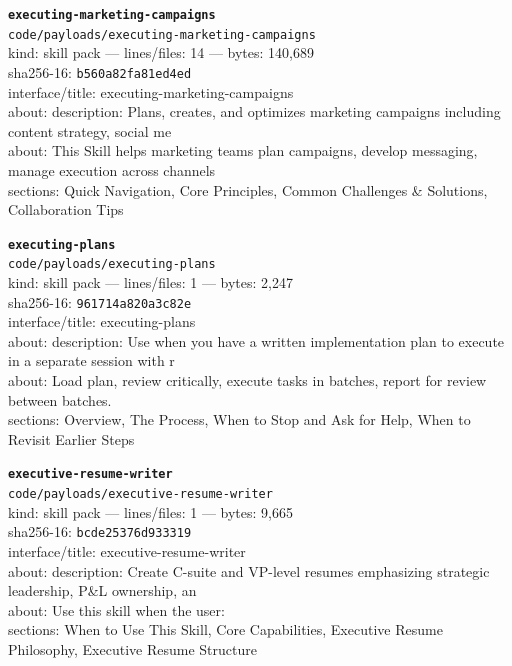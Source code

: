 \noindent\textbf{\texttt{executing-marketing-campaigns}}\\
\texttt{code/payloads/executing-marketing-campaigns}\\
kind: skill pack --- lines/files: 14 --- bytes: 140,689\\
sha256-16: \texttt{b560a82fa81ed4ed}\\
interface/title: executing-marketing-campaigns\\
about: description: Plans, creates, and optimizes marketing campaigns including content strategy, social me\\
about: This Skill helps marketing teams plan campaigns, develop messaging, manage execution across channels\\
sections: Quick Navigation, Core Principles, Common Challenges \& Solutions, Collaboration Tips\\
\vspace*{6.0pt}

\noindent\textbf{\texttt{executing-plans}}\\
\texttt{code/payloads/executing-plans}\\
kind: skill pack --- lines/files: 1 --- bytes: 2,247\\
sha256-16: \texttt{961714a820a3c82e}\\
interface/title: executing-plans\\
about: description: Use when you have a written implementation plan to execute in a separate session with r\\
about: Load plan, review critically, execute tasks in batches, report for review between batches.\\
sections: Overview, The Process, When to Stop and Ask for Help, When to Revisit Earlier Steps\\
\vspace*{6.0pt}
\newpage

\noindent\textbf{\texttt{executive-resume-writer}}\\
\texttt{code/payloads/executive-resume-writer}\\
kind: skill pack --- lines/files: 1 --- bytes: 9,665\\
sha256-16: \texttt{bcde25376d933319}\\
interface/title: executive-resume-writer\\
about: description: Create C-suite and VP-level resumes emphasizing strategic leadership, P\&L ownership, an\\
about: Use this skill when the user:\\
sections: When to Use This Skill, Core Capabilities, Executive Resume Philosophy, Executive Resume Structure\\
\vspace*{6.0pt}


